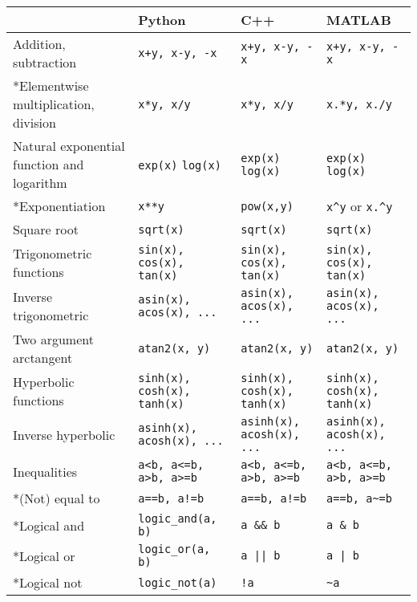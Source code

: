 \documentclass[a4paper,12pt]{book}
\begin{document}
\begin{center}
  \scriptsize
  \begin{tabular}{| p{3.5cm} | p{3.5cm} | p{3.5cm} | p{3.5cm} | }
    \hline
      & Python & C++ & MATLAB \\ \hline
    Addition, subtraction
    & \verb|x+y, x-y, -x| & \verb|x+y, x-y, -x| & \verb|x+y, x-y, -x| \\ \hline
    *Elementwise multiplication, division
    & \verb|x*y, x/y| & \verb|x*y, x/y| & \verb|x.*y, x./y| \\ \hline
    Natural exponential function and logarithm
    & \verb|exp(x)| \linebreak \verb|log(x)|
    & \verb|exp(x)| \linebreak \verb|log(x)|
    & \verb|exp(x)| \linebreak \verb|log(x)| \\ \hline
    *Exponentiation & \verb|x**y|
    & \verb|pow(x,y)| & \verb|x^y| or \verb|x.^y| \\ \hline
    Square root & \verb|sqrt(x)|
    & \verb|sqrt(x)| & \verb|sqrt(x)| \\ \hline
    Trigonometric functions & \verb|sin(x), cos(x), tan(x)| & \verb|sin(x), cos(x), tan(x)| & \verb|sin(x), cos(x), tan(x)| \\ \hline
    Inverse trigonometric & \verb|asin(x), acos(x), ...| & \verb|asin(x), acos(x), ...| & \verb|asin(x), acos(x), ...| \\ \hline
    Two argument arctangent & \verb|atan2(x, y)| & \verb|atan2(x, y)| & \verb|atan2(x, y)| \\ \hline
    Hyperbolic functions & \verb|sinh(x), cosh(x), tanh(x)| & \verb|sinh(x), cosh(x), tanh(x)| & \verb|sinh(x), cosh(x), tanh(x)| \\ \hline
    Inverse hyperbolic & \verb|asinh(x), acosh(x), ...| & \verb|asinh(x), acosh(x), ...| & \verb|asinh(x), acosh(x), ...| \\ \hline
    Inequalities & \verb|a<b, a<=b, a>b, a>=b| & \verb|a<b, a<=b, a>b, a>=b| & \verb|a<b, a<=b, a>b, a>=b| \\ \hline
    *(Not) equal to & \verb|a==b, a!=b| & \verb|a==b, a!=b| & \verb|a==b, a~=b| \\ \hline
    *Logical and & \verb|logic_and(a, b)| &\verb|a && b| &  \verb|a & b| \\ \hline
    *Logical or  & \verb|logic_or(a, b)| & \verb=a || b= & \verb=a | b= \\ \hline
    *Logical not & \verb|logic_not(a)| & \verb|!a| & \verb|~a| \\ \hline

\end{tabular}
\end{center}
\end{document}
